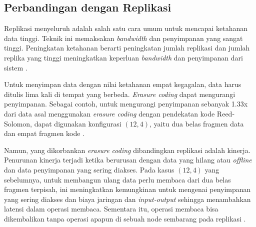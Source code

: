\subsection{Perbandingan dengan Replikasi}

Replikasi menyeluruh adalah salah satu cara umum untuk mencapai ketahanan data tinggi. Teknik ini memaksakan \textit{bandwidth} dan penyimpanan yang sangat tinggi. Peningkatan ketahanan berarti peningkatan jumlah replikasi dan jumlah replika yang tinggi meningkatkan keperluan \textit{bandwidth} dan penyimpanan dari sistem \parencite{weatherspoon2002erasure}.

Untuk menyimpan data dengan nilai ketahanan empat kegagalan, data harus ditulis lima kali di tempat yang berbeda. \textit{Erasure coding} dapat mengurangi penyimpanan. Sebagai contoh, untuk mengurangi penyimpanan sebanyak 1.33x dari data asal menggunakan \textit{erasure coding} dengan pendekatan kode Reed-Solomon, dapat digunakan konfigurasi $(12, 4)$, yaitu dua belas fragmen data dan empat fragmen kode \parencite{huang2012erasure}.

Namun, yang dikorbankan \textit{erasure coding} dibandingkan replikasi adalah kinerja. Penurunan kinerja terjadi ketika berurusan dengan data yang hilang atau \textit{offline} dan data penyimpanan yang sering diakses. Pada kasus $(12, 4)$ yang sebelumnya, untuk membangun ulang data perlu membaca dari dua belas fragmen terpisah, ini meningkatkan kemungkinan untuk mengenai penyimpanan yang sering diakses dan biaya jaringan dan \textit{input-output} sehingga menambahkan latensi dalam operasi membaca. Sementara itu, operasi membaca bisa dikembalikan tanpa operasi apapun di sebuah node sembarang pada replikasi \parencite{huang2012erasure}.